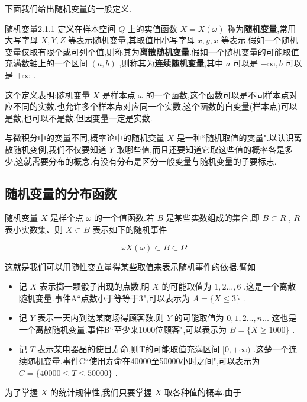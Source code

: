 下面我们给出随机变量的一般定义.

\begin{definition}{随机变量}{2.1.1}
	定义在样本空间 $ Q $ 上的实值函数 $ X=X(\omega) $ 称为\textbf{随机变量},常用大写字母 $ X,Y,Z $ 等表示随机变量,其取值用小写字母 $ x,y,x $ 等表示.假如一个随机变量仅取有限个或可列个值,则称其为\textbf{离散随机变量}.假如一个随机变量的可能取值充满数轴上的一个区间 $ (a,b) $ ,则称其为\textbf{连续随机变量},其中 $ a $ 可以是 $ -\infty ,b $ 可以是 $ +\infty $ .
\end{definition}


这个定义表明:随机变量 $ X $ 是样本点 $ \omega $ 的一个函数,这个函数可以是不同样本点对应不同的实数,也允许多个样本点对应同一个实数.这个函数的自变量(样本点)可以是数,也可以不是数,但因变量一定是实数.

与微积分中的变量不同,概率论中的随机变量 $ X $ 是一种``随机取值的变量".以认识离散随机变例,我们不仅要知道 $ Y $ 取哪些值,而且还要知道它取这些值的概率各是多少,这就需要分布的概念.有没有分布是区分一般变量与随机变量的子要标志.

\subsection{随机变量的分布函数}\label{ssec:2.1.2}

随机变量 $ X $ 是样个点 $ \omega $ 的一个值函数.若 $ B $ 是某些实数组成的集合,即 $ B\subset R $ , $ R $ 表小实数集、则 $ X\subset B $ 表示如下的随机事件

\[
\omega X(\omega)\subset B \subset \Omega
\]

这就是我们可以用随性变立量得某些取值来表示随机事件的依据.臂如

\begin{itemize}
	\item 记 $ X $ 表示掷一颗骰子出现的点数,明 $ X $ 的可能取值为 $ 1,2\dotsc ,6 $ .这是一个离散随机变量.事件A``点数小于等等于3",可以表示为 $ A=\{X\leq 3\} $ .
	\item 记 $ Y $ 表示一天内到达某商场得顾客数.则 $ Y $ 的可能取值为 $ 0,1,2\dotsc ,n\dotsc $ 这也是一个离散随机变量.事件B``至少来1000位顾客",可以表示为 $ B=\{ X\geq 1000 \} $ .
	\item 记 $ T $ 表示某电器品的使目寿命,则T的可能取值充满区间 $ [0,+\infty ) $ .这楚一个连续随机变量.事件C``使用寿命在40000至50000小时之间",可以表示为 $ C=\{ 40000 \leq T \leq 50000 \} $ . 
\end{itemize}

为了掌握 $ X $ 的统计规律性,我们只要掌握 $ X $ 取各种值的概率.由于


